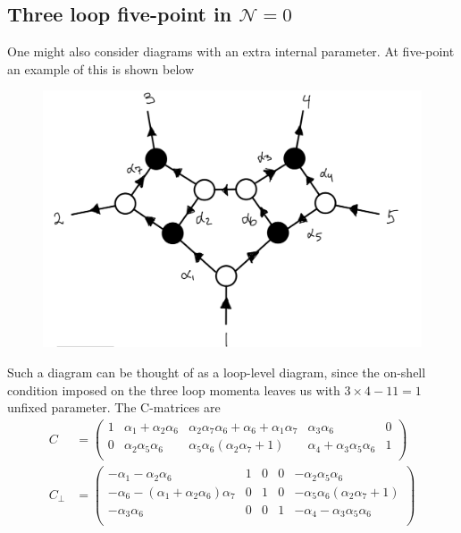 \documentclass[letter,11pt]{article}
\begin{document}
\subsection{Three loop five-point in $\mathcal{N}=0$}
One might also consider diagrams with an extra internal parameter. At five-point an example of this is shown below
\begin{figure}[H]
	\centering
	\includegraphics[width=0.5\linewidth]{5pt3l}
	\caption{}
	\label{fig:5pt3l_1}
\end{figure}
Such a diagram can be thought of as a loop-level diagram, since the on-shell condition imposed on the three loop momenta leaves us with $3\times 4-11=1$ unfixed parameter. The C-matrices are
\begin{equation}
	\begin{aligned}
		C&=\left(
		\begin{array}{ccccc}
			1 & \alpha _1+\alpha _2 \alpha _6 & \alpha _2 \alpha _7 \alpha _6+\alpha _6+\alpha _1 \alpha _7 & \alpha _3 \alpha _6 & 0 \\
			0 & \alpha _2 \alpha _5 \alpha _6 & \alpha _5 \alpha _6 \left(\alpha _2 \alpha _7+1\right) & \alpha _4+\alpha _3 \alpha _5 \alpha _6 & 1 \\
		\end{array}
		\right)\\
		C_\perp&=\left(
		\begin{array}{ccccc}
			-\alpha _1-\alpha _2 \alpha _6 & 1 & 0 & 0 & -\alpha _2 \alpha _5 \alpha _6 \\
			-\alpha _6-\left(\alpha _1+\alpha _2 \alpha _6\right) \alpha _7 & 0 & 1 & 0 & -\alpha _5 \alpha _6 \left(\alpha _2 \alpha _7+1\right) \\
			-\alpha _3 \alpha _6 & 0 & 0 & 1 & -\alpha _4-\alpha _3 \alpha _5 \alpha _6 \\
		\end{array}
		\right)
	\end{aligned}
\end{equation}
\end{document}
